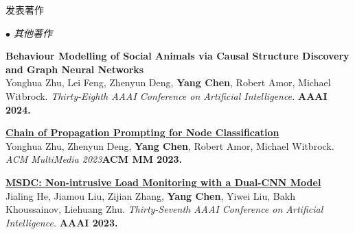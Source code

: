 \documentclass{resume} %
\begin{document}
\begin{rSection}{发表著作}
\begin{rSubsection}{\large\em $\bullet$ 其他著作}{}{}{}

\item {\bf Behaviour Modelling of Social Animals via Causal Structure Discovery and Graph Neural Networks}\\
		Yonghua Zhu, Lei Feng, Zhenyun Deng, \textbf{Yang Chen}, Robert Amor, Michael Witbrock. {\em Thirty-Eighth AAAI Conference on Artificial Intelligence.} \textbf{AAAI 2024.}\\
\item{
	\href{}{\bf Chain of Propagation Prompting for Node Classification}}\\
	Yonghua Zhu, Zhenyun Deng, \textbf{Yang Chen}, Robert Amor, Michael Witbrock. {\em ACM MultiMedia 2023}\textbf{ACM MM 2023.}\\
\item {
	\href{}{\bf MSDC: Non-intrusive Load Monitoring with a Dual-CNN Model}}\\
		Jialing He, Jiamou Liu, Zijian Zhang, \textbf{Yang Chen}, Yiwei Liu, Bakh Khoussainov, Liehuang Zhu. {\em Thirty-Seventh AAAI Conference on Artificial Intelligence.} \textbf{AAAI 2023.}\\


\end{rSubsection}
\end{rSection}
\end{document}
